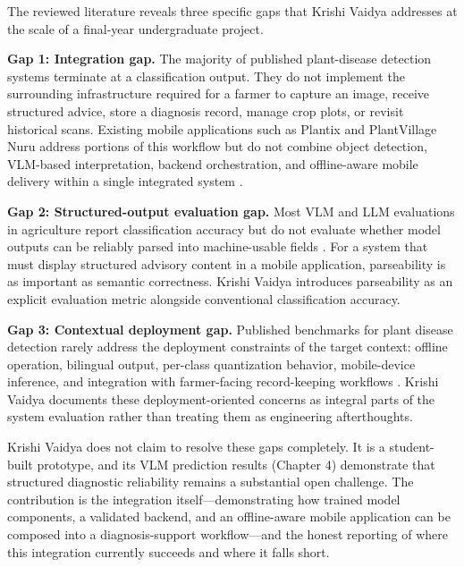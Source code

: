 
The reviewed literature reveals three specific gaps that Krishi Vaidya addresses at the scale
of a final-year undergraduate project.

\textbf{Gap 1: Integration gap.} The majority of published plant-disease detection systems
terminate at a classification output. They do not implement the surrounding infrastructure
required for a farmer to capture an image, receive structured advice, store a diagnosis record,
manage crop plots, or revisit historical scans. Existing mobile applications such as Plantix and
PlantVillage Nuru address portions of this workflow but do not combine object detection, VLM-based
interpretation, backend orchestration, and offline-aware mobile delivery within a single
integrated system
\parencite{petrellaPlantix2023,mrishoPlantVillageNuru2020,mohanty2016plantvillage}.

\textbf{Gap 2: Structured-output evaluation gap.} Most VLM and LLM evaluations in agriculture
report classification accuracy but do not evaluate whether model outputs can be reliably parsed
into machine-usable fields \parencite{wangAgriLLaVA2024,yangLLMCropDisease2024}. For a system
that must display structured advisory content in a mobile application, parseability is as
important as semantic correctness. Krishi Vaidya introduces parseability as an explicit
evaluation metric alongside conventional classification accuracy.

\textbf{Gap 3: Contextual deployment gap.} Published benchmarks for plant disease detection
rarely address the deployment constraints of the target context: offline operation, bilingual
output, per-class quantization behavior, mobile-device inference, and integration with
farmer-facing record-keeping workflows \parencite{thakurPlantDiseaseFieldGap2022}. Krishi
Vaidya documents these deployment-oriented concerns as integral parts of the system evaluation
rather than treating them as engineering afterthoughts.

Krishi Vaidya does not claim to resolve these gaps completely. It is a student-built prototype,
and its VLM prediction results (Chapter 4) demonstrate that structured diagnostic reliability
remains a substantial open challenge. The contribution is the integration itself---demonstrating
how trained model components, a validated backend, and an offline-aware mobile application can be
composed into a diagnosis-support workflow---and the honest reporting of where this integration
currently succeeds and where it falls short.
